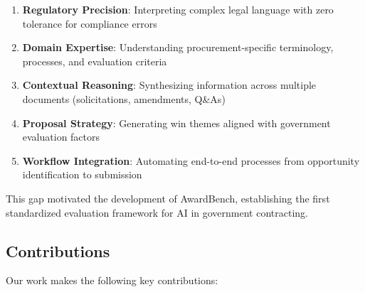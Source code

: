 \documentclass[11pt,a4paper]{article}
\begin{document}
\begin{enumerate}
    \item \textbf{Regulatory Precision}: Interpreting complex legal language with zero tolerance for compliance errors
    \item \textbf{Domain Expertise}: Understanding procurement-specific terminology, processes, and evaluation criteria
    \item \textbf{Contextual Reasoning}: Synthesizing information across multiple documents (solicitations, amendments, Q\&As)
    \item \textbf{Proposal Strategy}: Generating win themes aligned with government evaluation factors
    \item \textbf{Workflow Integration}: Automating end-to-end processes from opportunity identification to submission
\end{enumerate}

This gap motivated the development of AwardBench, establishing the first standardized evaluation framework for AI in government contracting.

\subsection{Contributions}

Our work makes the following key contributions:
\end{document}
